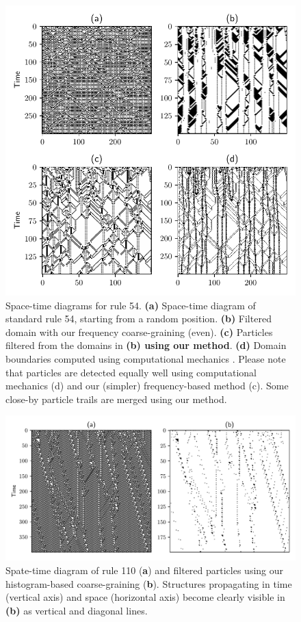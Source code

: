 \begin{figure}[th]
  \centering
  \includegraphics[width=\linewidth]{figures/rule54.pdf}
  \caption{\label{fig:rule54} Space-time diagrams for rule 54. \textbf{(a)}
    Space-time diagram of standard rule 54, starting from a random position.
    \textbf{(b)} Filtered domain with our frequency coarse-graining (even).
    \textbf{(c)} Particles filtered from the domains in \textbf{(b) using our
      method}. \textbf{(d)} Domain boundaries computed using computational
    mechanics \parencite{hansonComputationalMechanicsCellular1997}. Please note
    that particles are detected equally well using computational mechanics (d)
    and our (simpler) frequency-based method (c). Some close-by particle trails
    are merged using our method.}
\end{figure}

\begin{figure}[t]
  \centering
  \includegraphics[width=\linewidth]{figures/rule110.pdf}
  \caption{\label{fig:rule110} Spate-time diagram of rule 110 (\textbf{a}) and
    filtered particles using our histogram-based coarse-graining (\textbf{b}).
    Structures propagating in time (vertical axis) and space (horizontal axis)
    become clearly visible in \textbf{(b)} as vertical and diagonal lines.
  }
\end{figure}
